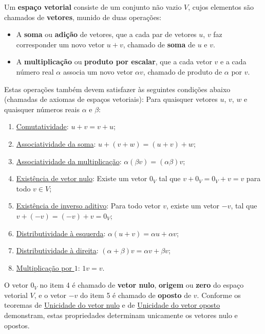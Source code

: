 \begin{definition}
	Um \textbf{espaço vetorial} consiste de um conjunto não vazio $V$, cujos elementos são chamados de \textbf{vetores}, munido de duas operações:
	\begin{itemize}
		\item A \textbf{soma} ou \textbf{adição} de vetores, que a cada par de vetores $u$, $v$ faz corresponder um novo vetor $u+v$, chamado de \textbf{soma} de $u$ e $v$.
		\item A \textbf{multiplicação} ou \textbf{produto por escalar}, que a cada vetor $v$ e a cada número real $\alpha$ associa um novo vetor $\alpha v$, chamado de produto de $\alpha$ por $v$.
	\end{itemize}
	
	Estas operações também devem satisfazer às seguintes condições abaixo (chamadas de axiomas de espaços vetoriais): Para quaisquer vetores $u$, $v$, $w$ e quaisquer números reais $\alpha$ e $\beta$:
	\begin{enumerate}
		\item \uline{Comutatividade}: $u+v=v+u$;
		\item \uline{Associatividade da soma}: $u+(v+w)=(u+v)+w$;
		\item \uline{Associatividade da multiplicação}: $\alpha(\beta v)=(\alpha\beta)v$;
		\item \uline{Existência de vetor nulo}: Existe um vetor $0_V$ tal que $v+0_V=0_V+v=v$ para todo $v\in V$;
		\item \uline{Existência de inverso aditivo}: Para todo vetor $v$, existe um vetor $−v$, tal que $v+(−v)=(-v)+v=0_V$;
		\item \uline{Distributividade à esquerda}: $\alpha(u+v)=\alpha u+\alpha v$;
		\item \uline{Distributividade à direita}: $(\alpha+\beta)v=\alpha v+\beta v$;
		\item \uline{Multiplicação por $1$}: $1v=v$.
	\end{enumerate}
	
	O vetor $0_V$ no item 4 é chamado de \textbf{vetor nulo}, \textbf{origem} ou \textbf{zero} do espaço vetorial $V$, e o vetor $-v$ do item 5 é chamado de \textbf{oposto} de $v$. Conforme os teoremas de \href{http://mtm.ufsc.br/~cordeiro/ensino/mtm3112.algebra.linear/01.esp.vet/teo_unicidade_vetor_nulo_moodle.html}{Unicidade do vetor nulo} e de \href{http://mtm.ufsc.br/~cordeiro/ensino/mtm3112.algebra.linear/01.esp.vet/teo_unicidade_vetor_oposto_moodle.html}{Unicidade do vetor oposto} demonstram, estas propriedades determinam unicamente os vetores nulo e opostos.
\end{definition}